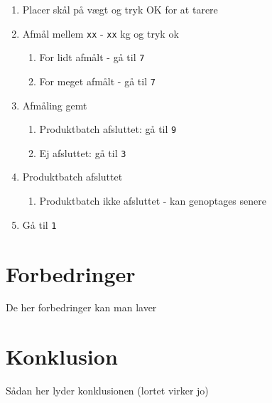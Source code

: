 \documentclass[a4paper]{article}
\begin{document}
\begin{enumerate}
\begin{enumerate}
    \end{enumerate}
  \item Placer skål på vægt og tryk OK for at tarere
  \item Afmål mellem \texttt{xx} - \texttt{xx} kg og tryk ok
    \begin{enumerate}
      \item For lidt afmålt - gå til \texttt{7}
      \item For meget afmålt - gå til \texttt{7}
    \end{enumerate}
  \item Afmåling gemt
    \begin{enumerate}
      \item Produktbatch afsluttet: gå til \texttt{9}
      \item Ej afsluttet: gå til \texttt{3}
    \end{enumerate}
  \item Produktbatch afsluttet
    \begin{enumerate}
      \item Produktbatch ikke afsluttet - kan genoptages senere
    \end{enumerate}
  \item Gå til \texttt{1}
\end{enumerate}


\clearpage




\section{Forbedringer} %

De her forbedringer kan man laver

\clearpage




\section{Konklusion} %

Sådan her lyder konklusionen (lortet virker jo)

\end{document}
